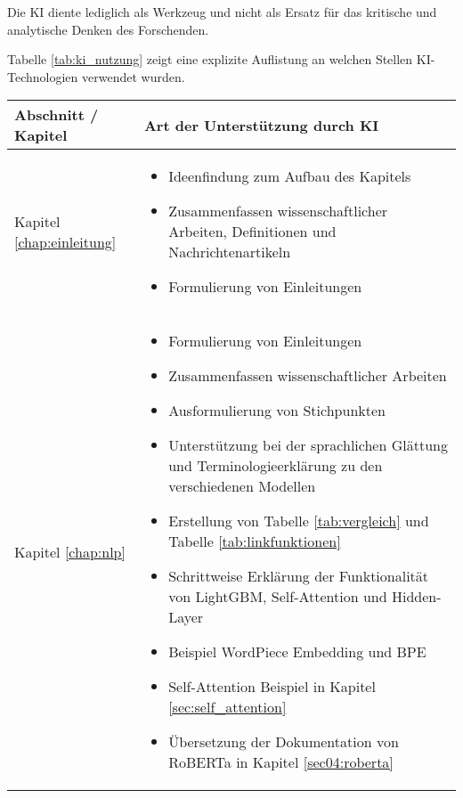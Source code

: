 Die KI diente lediglich als Werkzeug und nicht als Ersatz für das kritische und analytische Denken des Forschenden.

Tabelle \ref{tab:ki_nutzung} zeigt eine explizite Auflistung an welchen Stellen KI-Technologien verwendet wurden.

\begin{table}[!ht]
    \centering
    \begin{tabular}{|p{3cm}|p{10.5cm}|}
        \hline
        \rowcolor{lightgray} \textbf{Abschnitt / Kapitel} & \textbf{Art der Unterstützung durch KI} \\
        \hline
        Kapitel \ref{chap:einleitung} & 
            \begin{itemize}[leftmargin=*,noitemsep,topsep=0pt,partopsep=0pt]
                \item Ideenfindung zum Aufbau des Kapitels
                \item Zusammenfassen wissenschaftlicher Arbeiten, Definitionen und Nachrichtenartikeln
                \item Formulierung von Einleitungen
            \end{itemize} \\
        \hline
        Kapitel \ref{chap:nlp} & 
            \begin{itemize}[leftmargin=*,noitemsep,topsep=0pt,partopsep=0pt]
                \item Formulierung von Einleitungen
                \item Zusammenfassen wissenschaftlicher Arbeiten
                \item Ausformulierung von Stichpunkten
                \item Unterstützung bei der sprachlichen Glättung und Terminologieerklärung zu den verschiedenen Modellen
                \item Erstellung von Tabelle \ref{tab:vergleich} und Tabelle \ref{tab:linkfunktionen}
                \item Schrittweise Erklärung der Funktionalität von LightGBM, Self-Attention und Hidden-Layer
                \item Beispiel WordPiece Embedding und BPE
                \item Self-Attention Beispiel in Kapitel \ref{sec:self_attention}
                \item Übersetzung der Dokumentation von RoBERTa in Kapitel \ref{sec04:roberta}
            \end{itemize} \\

\end{tabular}
\end{table}
